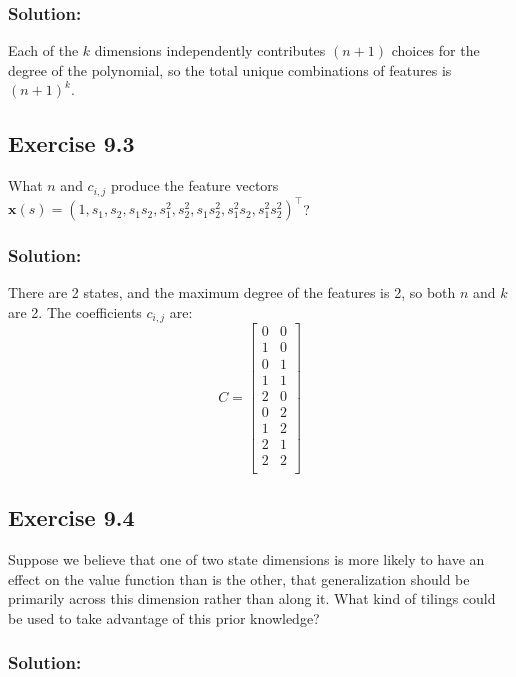 \subsubsection*{Solution:}

Each of the $k$ dimensions independently contributes $(n+1)$ choices for the degree of the polynomial, so the total unique combinations of features is $(n+1)^k$.

\subsection*{Exercise 9.3}

What $n$ and $c_{i,j}$ produce the feature vectors $\mathbf{x}(s) = (1, s_1, s_2, s_1s_2, s_1^2, s_2^2, s_1s_2^2, s_1^2 s_2, s_1^2 s_2^2)^\top$?

\subsubsection*{Solution:}

There are 2 states, and the maximum degree of the features is 2, so both $n$ and $k$ are 2. The coefficients $c_{i,j}$ are:
\[
C = \begin{bmatrix}
    0 & 0 \\
    1 & 0 \\
    0 & 1 \\
    1 & 1 \\
    2 & 0 \\
    0 & 2 \\
    1 & 2 \\
    2 & 1 \\
    2 & 2 \\
\end{bmatrix}
\]

\subsection*{Exercise 9.4}

Suppose we believe that one of two state dimensions is more likely to have
an effect on the value function than is the other, that generalization should be primarily
across this dimension rather than along it. What kind of tilings could be used to take
advantage of this prior knowledge?

\subsubsection*{Solution:}

